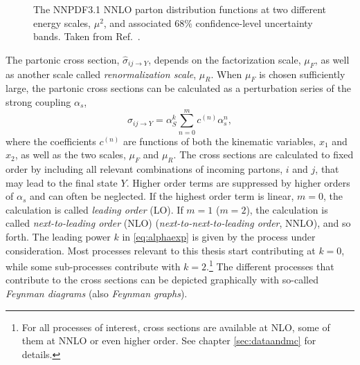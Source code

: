 \begin{figure}
  \caption[The NNPDF3.1 NNLO parton distribution functions at two different energy scales, $\mu^2$, and associated 68\% confidence-level uncertainty bands.]{The NNPDF3.1 NNLO parton distribution functions at two different energy scales, $\mu^2$, and associated 68\% confidence-level uncertainty bands. Taken from Ref.~\cite{2017NNPDF}.}
  \label{fig:pdfs}
\end{figure}

The partonic cross section, $\hat{\sigma}_{ij \rightarrow Y}$, depends on the factorization scale, $\mu_F$, as well as another scale called \emph{renormalization scale}, $\mu_R$.
When $\mu_F$ is chosen sufficiently large, the partonic cross sections can be calculated as a perturbation series of the strong coupling $\alpha_s$,
\begin{equation}
  \hat{\sigma}_{ij \rightarrow Y} = \alpha^k_S \sum_{n=0}^{m} c^{(n)}\alpha_s^n,
  \label{eq:alphaexp}
\end{equation}
where the coefficients $c^{(n)}$ are functions of both the kinematic variables, $x_1$ and $x_2$, as well as the two scales, $\mu_F$ and $\mu_R$. The cross sections are calculated to fixed order by including all relevant combinations of incoming partons, $i$ and $j$, that may lead to the final state $Y$. Higher order terms are suppressed by higher orders of $\alpha_s$ and can often be neglected.
If the highest order term is linear, $m=0$, the calculation is called \emph{leading order} (LO). If $m=1$ ($m=2$), the calculation is called \emph{next-to-leading order} (NLO) (\emph{next-to-next-to-leading order}, NNLO), and so forth. 
The leading power $k$ in \cref{eq:alphaexp} is given by the process under consideration. Most processes relevant to this thesis start contributing at $k=0$, while some sub-processes contribute with $k=2$.\footnote{For all processes of interest, cross sections are available at NLO, some of them at NNLO or even higher order. See chapter \cref{sec:dataandmc} for details.}
The different processes that contribute to the cross sections can be depicted graphically with so-called \emph{Feynman diagrams} (also \emph{Feynman graphs}). 
